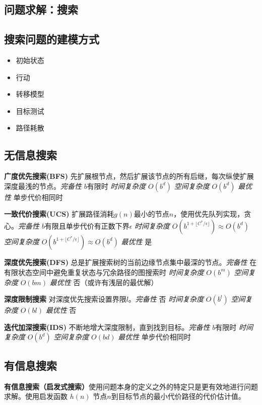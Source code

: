 \documentclass[10pt,a4paper]{ctexart}
\begin{document}
\begin{multicols}{3}
        \section{问题求解：搜索}
        \subsection{搜索问题的建模方式}
        \begin{itemize}
            \item 初始状态
            \item 行动
            \item 转移模型
            \item 目标测试
            \item 路径耗散
        \end{itemize}
        \subsection{无信息搜索}
        \textbf{广度优先搜索(BFS)}
        先扩展根节点，然后扩展该节点的所有后继，每次纵使扩展深度最浅的节点。\emph{完备性} $b$有限时 \emph{时间复杂度} $O(b^d)$ \emph{空间复杂度} $O(b^d)$ \emph{最优性} 单步代价相同时
        
        \textbf{一致代价搜索(UCS)}
        扩展路径消耗$g(n)$最小的节点$n$，使用优先队列实现，贪心。\emph{完备性} $b$有限且单步代价有正数下界$\epsilon$ \emph{时间复杂度} $O(b^{1+\lfloor C^*/\epsilon\rfloor})\approx O(b^d)$ \emph{空间复杂度} $O(b^{1+\lfloor C^*/\epsilon\rfloor})\approx O(b^d)$ \emph{最优性} 是

        \textbf{深度优先搜索(DFS)}
        总是扩展搜索树的当前边缘节点集中最深的节点。\emph{完备性} 在有限状态空间中避免重复状态与冗余路径的图搜索时 \emph{时间复杂度} $O(b^m)$ \emph{空间复杂度} $O(bm)$ \emph{最优性} 否（或许有浅层的最优解）

        \textbf{深度限制搜索}
        对深度优先搜索设置界限$l$。\emph{完备性} 否 \emph{时间复杂度} $O(b^l)$ \emph{空间复杂度} $O(bl)$ \emph{最优性} 否

        \textbf{迭代加深搜索(IDS)}
        不断地增大深度限制，直到找到目标。\emph{完备性} $b$有限时 \emph{时间复杂度} $O(b^d)$ \emph{空间复杂度} $O(bd)$ \emph{最优性} 单步代价相同时

        \subsection{有信息搜索}
        \textbf{有信息搜索（启发式搜索）}使用问题本身的定义之外的特定只是更有效地进行问题求解。使用启发函数 $h(n)$ 节点$n$到目标节点的最小代价路径的代价估计值。
        

\end{multicols}
\end{document}
